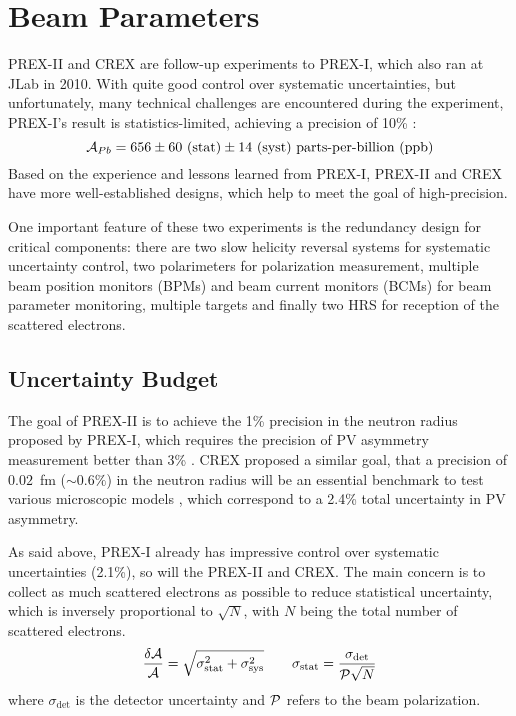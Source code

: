 \section{Beam Parameters}
PREX-II and CREX are follow-up experiments to PREX-I, which also ran at JLab in 2010. 
With quite good control over systematic uncertainties, but unfortunately, 
many technical challenges are encountered during the experiment, PREX-I's result is 
statistics-limited, achieving a precision of 10\% \cite{PhysRevLett.108.112502}:
$$ \CA_{Pb} = 656 \pm 60 \ (\text{stat}) \pm 14 \ (\text{syst}) \ \text{parts-per-billion (ppb)} $$
Based on the experience and lessons learned from PREX-I, 
PREX-II and CREX have more well-established designs, which help to
meet the goal of high-precision.

One important feature of these two experiments is the redundancy design for critical
components: there are two slow helicity reversal systems for systematic uncertainty control,
two polarimeters for polarization measurement, multiple beam position
monitors (BPMs) and beam current monitors (BCMs) for beam parameter monitoring, 
multiple \Pb targets and finally two HRS for reception of the scattered electrons.

\subsection{Uncertainty Budget}
The goal of PREX-II is to achieve the 1\% precision in the \Pb neutron radius proposed
by PREX-I, which requires the precision of PV asymmetry measurement better than 3\% \cite{PhysRevLett.106.252501}. 
CREX proposed a similar goal, that a precision of $0.02$~fm ($\sim 0.6\%$) in the
\Ca neutron radius will be an essential benchmark to test various microscopic 
models \cite{crex_proposal}, which correspond to a 2.4\% total uncertainty in PV asymmetry.

As said above, PREX-I already has impressive control over systematic uncertainties (2.1\%),
so will the PREX-II and CREX. The main concern is to collect as much scattered 
electrons as possible to reduce statistical uncertainty, which is inversely 
proportional to $\sqrt{N}$, with $N$ being the total number of scattered electrons.
\begin{equation}
    \frac{\delta \mathcal{A}}{\mathcal{A}} = \sqrt{\sigma^2_{\text{stat}} + \sigma^2_{\text{sys}}}	
    \qquad 
    \sigma_{\text{stat}} = \frac{\sigma_{\text{det}}}{\mathcal{P}\sqrt{N}}
\end{equation}
where $\sigma_{\text{det}}$ is the detector uncertainty and $\mathcal{P}$ refers to the beam polarization.

